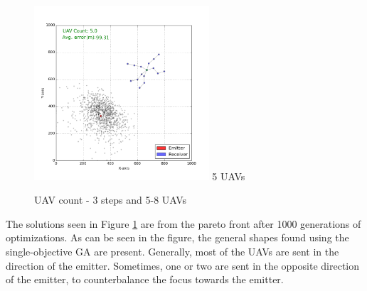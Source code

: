 \documentclass[10pt,a4paper]{book}
\begin{document}
\begin{figure}[H]
\begin{minipage}{60mm}
  \centering
\includegraphics[width=65mm]{3_steps/Generation_1000/Pareto_3.png}
  5 \glspl{UAV}
\end{minipage}
\caption{\gls{UAV} count - 3 steps and 5-8 \glspl{UAV}}
\label{moea_count_5_8}
\end{figure}

The solutions seen in Figure \ref{moea_count_5_8} are from the pareto front after 1000 generations of optimizations. As can be seen in the figure, the general shapes found using the single-objective \gls{GA} are present. Generally, most of the \glspl{UAV} are sent in the direction of the emitter. Sometimes, one or two are sent in the opposite direction of the emitter, to counterbalance the focus towards the emitter.  
\end{document}
